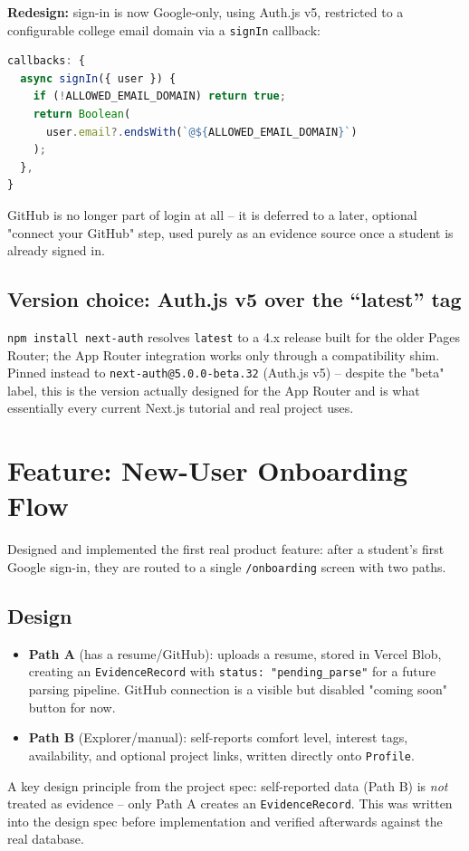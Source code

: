 \documentclass[11pt,a4paper]{article}
\begin{document}
\textbf{Redesign:} sign-in is now Google-only, using Auth.js v5,
restricted to a configurable college email domain via a
\texttt{signIn} callback:
\begin{lstlisting}[language=JavaScript]
callbacks: {
  async signIn({ user }) {
    if (!ALLOWED_EMAIL_DOMAIN) return true;
    return Boolean(
      user.email?.endsWith(`@${ALLOWED_EMAIL_DOMAIN}`)
    );
  },
}
\end{lstlisting}
GitHub is no longer part of login at all -- it is deferred to a
later, optional "connect your GitHub" step, used purely as an
evidence source once a student is already signed in.

\subsection{Version choice: Auth.js v5 over the ``latest'' tag}
\texttt{npm install next-auth} resolves \texttt{latest} to a 4.x
release built for the older Pages Router; the App Router
integration works only through a compatibility shim. Pinned
instead to \texttt{next-auth@5.0.0-beta.32} (Auth.js v5) --
despite the "beta" label, this is the version actually designed
for the App Router and is what essentially every current Next.js
tutorial and real project uses.

\section{Feature: New-User Onboarding Flow}
Designed and implemented the first real product feature: after a
student's first Google sign-in, they are routed to a single
\texttt{/onboarding} screen with two paths.

\subsection{Design}
\begin{itemize}[leftmargin=0.7cm]
  \item \textbf{Path A} (has a resume/GitHub): uploads a resume,
    stored in Vercel Blob, creating an \texttt{EvidenceRecord}
    with \texttt{status: "pending\_parse"} for a future parsing
    pipeline. GitHub connection is a visible but disabled
    "coming soon" button for now.
  \item \textbf{Path B} (Explorer/manual): self-reports comfort
    level, interest tags, availability, and optional project
    links, written directly onto \texttt{Profile}.
\end{itemize}
A key design principle from the project spec: self-reported data
(Path B) is \emph{not} treated as evidence -- only Path A creates
an \texttt{EvidenceRecord}. This was written into the design spec
before implementation and verified afterwards against the real
database.
\end{document}
